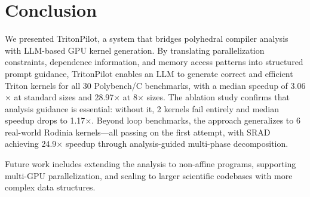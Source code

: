 \documentclass[sigconf]{acmart}
\newcommand{\sysname}{TritonPilot\xspace}
\begin{document}
\section{Conclusion}
\label{sec:conclusion}

We presented \sysname, a system that bridges polyhedral compiler
analysis with LLM-based GPU kernel generation.  By translating
parallelization constraints, dependence information, and memory access
patterns into structured prompt guidance, \sysname enables an LLM to
generate correct and efficient Triton kernels for all 30 Polybench/C
benchmarks, with a median speedup of 3.06$\times$ at standard sizes
and 28.97$\times$ at 8$\times$ sizes.  The ablation study confirms that
analysis guidance is essential: without it, 2 kernels fail entirely and
median speedup drops to 1.17$\times$.  Beyond loop benchmarks, the
approach generalizes to 6 real-world Rodinia kernels---all passing on
the first attempt, with SRAD achieving 24.9$\times$ speedup through
analysis-guided multi-phase decomposition.

Future work includes extending the analysis to non-affine programs,
supporting multi-GPU parallelization, and scaling to larger scientific
codebases with more complex data structures.
\end{document}

